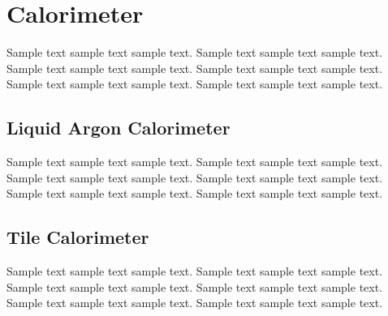 \section{Calorimeter}
\label{sec:calo}
Sample text sample text sample text. Sample text sample text sample text.
Sample text sample text sample text. Sample text sample text sample text.
Sample text sample text sample text. Sample text sample text sample text.

\subsection{Liquid Argon Calorimeter}
Sample text sample text sample text. Sample text sample text sample text.
Sample text sample text sample text. Sample text sample text sample text.
Sample text sample text sample text. Sample text sample text sample text.

\subsection{Tile Calorimeter}
Sample text sample text sample text. Sample text sample text sample text.
Sample text sample text sample text. Sample text sample text sample text.
Sample text sample text sample text. Sample text sample text sample text.

